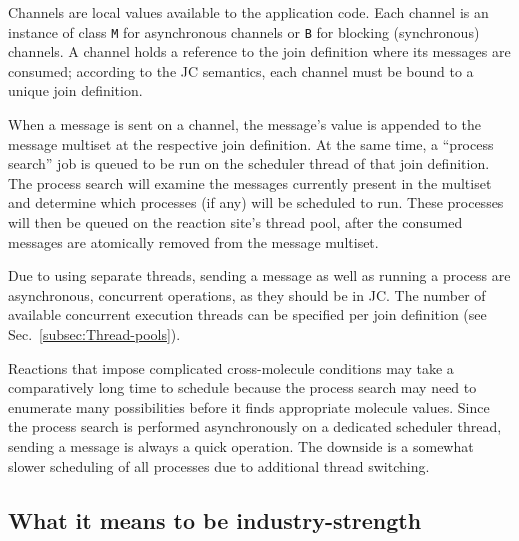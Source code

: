 \documentclass[sigplan,10pt,review,anonymous]{acmart}\settopmatter{printfolios=true}
\begin{document}
Channels are local values available to the application code. Each
channel is an instance of class \texttt{M} for asynchronous channels
or \texttt{B} for blocking (synchronous) channels. A channel holds
a reference to the join definition where its messages are consumed;
according to the JC semantics, each channel must be bound to a unique
join definition.

When a message is sent on a channel, the message's value is appended
to the message multiset at the respective join definition. At the
same time, a ``process search'' job is queued to be run on the scheduler
thread of that join definition. The process search will examine the
messages currently present in the multiset and determine which processes
(if any) will be scheduled to run. These processes will then be queued
on the reaction site's thread pool, after the consumed messages are
atomically removed from the message multiset. 

Due to using separate threads, sending a message as well as running
a process are asynchronous, concurrent operations, as they should
be in JC. The number of available concurrent execution threads can
be specified per join definition (see Sec.~\ref{subsec:Thread-pools}).

Reactions that impose complicated cross-molecule conditions may take
a comparatively long time to schedule because the process search may
need to enumerate many possibilities before it finds appropriate molecule
values. Since the process search is performed asynchronously on a
dedicated scheduler thread, sending a message is always a quick operation.
The downside is a somewhat slower scheduling of all processes due
to additional thread switching.

\subsection{What it means to be industry-strength}
\end{document}
